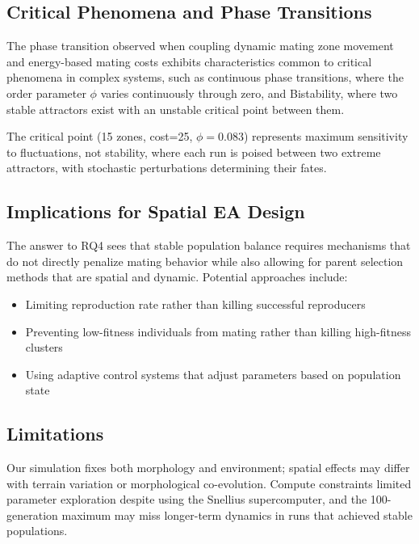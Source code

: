 \documentclass[dvipsnames,format=sigconf,anonymous=false,review=false]{acmart}
\begin{document}
\subsection{Critical Phenomena and Phase Transitions}

The phase transition observed when coupling dynamic mating zone movement and energy-based mating costs exhibits characteristics common to critical phenomena in complex systems, such as continuous phase transitions, where the order parameter $\phi$ varies continuously through zero, and Bistability, where two stable attractors exist with an unstable critical point between them.

The critical point (15 zones, cost=25, $\phi = 0.083$) represents maximum sensitivity to fluctuations, not stability, where each run is poised between two extreme attractors, with stochastic perturbations determining their fates.

\subsection{Implications for Spatial EA Design}

The answer to RQ4 sees that stable population balance requires mechanisms that do not directly penalize mating behavior while also allowing for parent selection methods that are spatial and dynamic. Potential approaches include:
\begin{itemize}
  \item Limiting reproduction rate rather than killing successful reproducers
  \item Preventing low-fitness individuals from mating rather than killing high-fitness clusters
  \item Using adaptive control systems that adjust parameters based on population state
\end{itemize}

\subsection{Limitations}

Our simulation fixes both morphology and environment; spatial effects may differ with terrain variation or morphological co-evolution. Compute constraints limited parameter exploration despite using the Snellius supercomputer, and the 100-generation maximum may miss longer-term dynamics in runs that achieved stable populations.
\end{document}
